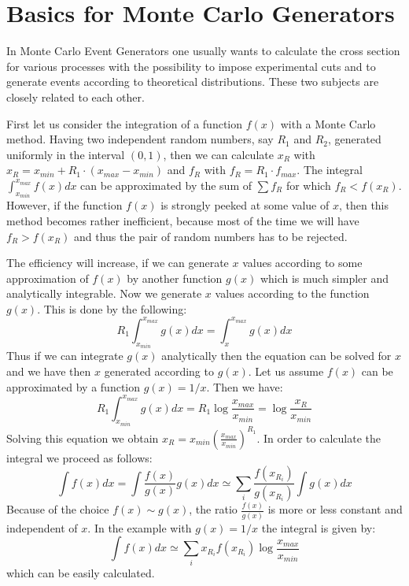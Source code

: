 \documentclass[10pt]{article} \usepackage{dina4}
\begin{document}
\section{Basics for Monte Carlo Generators}

In Monte Carlo Event Generators one usually wants to calculate the cross 
section for various processes with the possibility to impose experimental
cuts and to generate events according to theoretical distributions. These
two subjects are closely related to each other.
\par
First let us consider the integration of a function $f(x)$ with a Monte Carlo
method. Having two independent random numbers, say $R_1$ and $R_2$, 
generated uniformly in the interval $(0,1)$, 
then we can calculate $x_R$ with
$x_R = x_{min} + R_1 \cdot (x_{max} - x_{min})$ and $f_R$ with 
 $f_R =  R_1 \cdot f_{max}$. 
The integral $\int _{x_{min}} ^{x_{max}} f(x) dx $
can be approximated by the sum of $\sum f_R $ for which $f_R < f(x_R)$.
However, if the function $f(x)$ is strongly peeked at some value of $x$,
then this method becomes rather inefficient, because most of the
time we will have $f_R > f(x_R)$ and thus the pair of random numbers
has to be rejected.
\par
The efficiency will increase, if we can generate $x$ values according to
some approximation of $f(x)$  
 by another function $g(x)$ which is much
simpler and analytically integrable. Now we generate $x$ values according 
to the function $g(x)$. This is done by the following:
$$
 R_1 \int _ {x_{min}} ^{x_{max}} g(x) dx = 
\int _ {x} ^{x_{max}} g(x) dx
$$
Thus if we can integrate $g(x)$ analytically 
then the equation can be solved for $x$
and we have then $x$ generated according to $g(x)$. Let us assume $f(x)$
can be approximated by a function $g(x) = 1/x$. Then we have:
$$ R_1 \int _ {x_{min}} ^{x_{max}} g(x) dx 
= R_1 \log \frac{x_{max}}{x_{min}} 
 = \log \frac{x_R}{x_{min}} $$
Solving this equation 
we obtain $x_R= x_{min} ( \frac{x_{max}}{x_{min}})^{R_1}$.
In order to calculate the integral we proceed as follows:
$$
\int f(x) dx = \int \frac{f(x)}{g(x)} g(x) dx 
\simeq \sum _i  \frac{f(x_{R_i})}{g(x_{R_i})} \int g(x) dx $$
Because of the choice $f(x) \sim g(x)$, the ratio $\frac{f(x)}{g(x)}$ is
more or less constant and independent of $x$. In the example with $g(x)=1/x$
the integral is given by:
\begin{equation}
\int f(x) dx 
\simeq \sum _i x_{R_i} f(x_{R_i}) \log \frac{x_{max}}{x_{min}} 
\label{MCweight}
\end{equation}
which can be easily calculated. 
\end{document}
